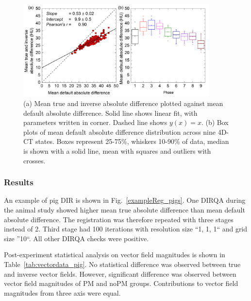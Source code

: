\begin{figure}[H]
	\begin{center}		
		\includegraphics[width=0.9\textwidth]{./Vmm/Images/AbsDiff_pigs.png}
		\caption{(a) Mean true and inverse absolute difference plotted against mean default absolute difference. Solid line shows linear fit, with parameters
		written in corner. Dashed line shows $y(x)=x$. (b) Box plots of mean default absolute difference distribution across nine 4D-CT states. Boxes represent 25-75\%, whiskers 10-90\%
		of data, median is shown with a solid line, mean with squares and outliers with crosses.}
		\label{absDiff_pigs}
	\end{center}
\end{figure}

\subsubsection{Results}

An example of pig DIR is shown in Fig.~\ref{exampleReg_pigs}. One DIRQA during the animal study showed higher mean true absolute difference than mean default absolute difference. The registration
was therefore repeated with three stages instead of 2. Third stage had 100 iterations with resolution size ``1, 1, 1`` and grid size ''10``. All other DIRQA checks were positive.

Post-experiment statistical analysis on vector field magnitudes is shown in Table~\ref{tab:vectordata_pig}. No statistical difference was
observed between true and inverse vector fields. However, significant difference was observed between vector field magnitudes of PM and noPM groups. Contributions to vector field magnitudes from three axis were equal. 


